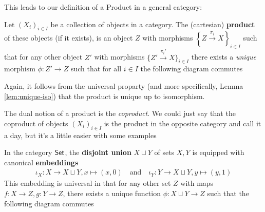 This leads to our definition of a Product in a general category:
\begin{dfn}[]
  Let $(X_i)_{i \in I}$ be a collection of objects in a category. The (cartesian) \textbf{product} of these objects (if it exists), is an object $Z$ with morphisms 
  $\left\{Z \stackrel{\pi_i}{\to}X\right\}_{i \in I}$ 
  such that for any other object $Z'$ with morphisms
  $\big\{Z' \stackrel{\pi_i'}{\to}X\big\}_{i \in I}$ there exists a \emph{unique} morphism $\phi: Z' \to Z$ such that for all $i \in I$ the following diagram commutes
  \begin{center}
  \end{center}
\end{dfn}
Again, it follows from the universal proparty (and more specifically, Lemma \ref{lem:unique-iso}) that the product is unique up to isomorphism.

The dual notion of a product is the \emph{coproduct}. 
We could just say that the coproduct of objects $(X_i)_{i \in I}$ is the product in the opposite category and call it a day, but it's a little easier with some examples
\begin{ex}[Coproduct]
In the category $\text{\sffamily Set}$, the \textbf{disjoint union} $X \sqcup Y$ of sets $X,Y$ is equipped with canonical \textbf{embeddings}
\begin{align*}
  \iota_X: X \to X \sqcup Y, x \mapsto (x,0)
  \quad \text{and} \quad 
  \iota_Y: Y \to X \sqcup Y, y \mapsto (y,1)
\end{align*}
This embedding is universal in that for any other set $Z$ with maps $f: X \to Z, g: Y \to Z$, there exists a unique function $\phi: X \sqcup Y \to Z$ such that the following diagram commutes
  \begin{center}
  \end{center}
\end{ex}

